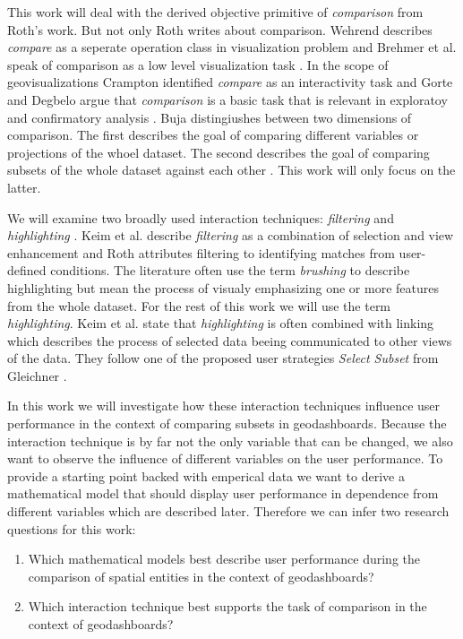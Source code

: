 \documentclass[12pt, twoside]{article}
\begin{document}
This work will deal with the derived objective primitive of \textit{comparison} from Roth's work.
But not only Roth writes about comparison. Wehrend describes \textit{compare} as a seperate
operation class in visualization problem \citep{Wehrend.1990} and Brehmer et al.
speak of comparison as a low level visualization task \citep*{Brehmer.2013}. In the
scope of geovisualizations Crampton identified \textit{compare} as an interactivity task
\citep{Crampton.2002} and Gorte and Degbelo argue that \textit{comparison} is a basic
task that is relevant in exploratoy and confirmatory analysis \citep{Gorte.2022}.
Buja distingiushes between two dimensions of comparison. The first
describes the goal of comparing different variables or projections of the whoel dataset.
The second describes the goal of comparing subsets of the whole dataset against each
other \citep*{Buja.1996}. This work will only focus on the latter. 

We will examine two broadly used interaction techniques: \textit{filtering} and
\textit{highlighting} \citep*{Keim.2005,Roth.2013}. Keim et al. describe \textit{filtering} as a
combination of selection and view enhancement and Roth attributes filtering to identifying matches
from user-defined conditions. The literature often use the term \textit{brushing} 
to describe highlighting but mean the process of visualy emphasizing one or more features from the
whole dataset. For the rest of this work we will use the term \textit{highlighting}. Keim et al. state
that \textit{highlighting} is often combined with linking which describes the process of selected data
beeing communicated to other views of the data. They follow one of the proposed user strategies
\textit{Select Subset} from Gleichner \citep*{Gleicher.2018}.

In this work we will investigate how these interaction techniques influence user performance
in the context of comparing subsets in geodashboards. Because the interaction technique is
by far not the only variable that can be changed, we also want to observe the influence of
different variables on the user performance. To provide a starting point backed with emperical
data we want to derive a mathematical model that should display user performance in dependence
from different variables which are described later. Therefore we can infer two research
questions for this work:
\begin{enumerate}
    \item Which mathematical models best describe user performance during the comparison of spatial entities
    in the context of geodashboards?
    \item Which interaction technique best supports the task of comparison in the context of
    geodashboards? 
\end{enumerate}
\end{document}
